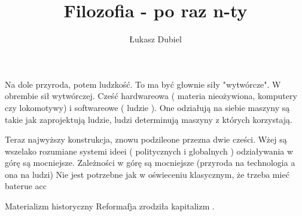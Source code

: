 \documentclass[11pt]{article}
\author{Łukasz Dubiel}
\title{Filozofia - po raz n-ty }
\begin{document}
\maketitle

Na dole przyroda, potem ludzkość. To ma być głownie siły "wytwórcze". W obrembie sił wytwórczej. Cześć hardwareowa ( materia nieożywiona, komputery czy lokomotywy) i softwareowe ( ludzie ). One odziałują na siebie maszyny są takie jak zaprojektują ludzie, ludzi determinują maszyny z których korzystają.

Teraz najwyższy konstrukcja, znowu podzileone przezna dwie cześci. Wżej są wszelako rozumiane systemi ideei ( politycznych i globalnych ) odziaływania w górę są mocniejsze. Zależności w górę są mocniejsze (przyroda na technologia a ona na ludzi) Nie jest potrzebne jak w oświeceniu klasycznym, że trzeba mieć baterue acc 

{Materializm historyczny }
Reformafja zrodziła kapitalizm .
\end{document}

